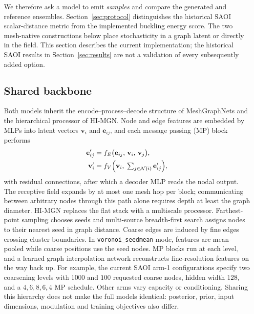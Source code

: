 We therefore ask a model to emit \emph{samples} and compare the generated and
reference ensembles. Section~\ref{sec:protocol} distinguishes the historical
SAOI scalar-distance metric from the implemented buckling energy score. The
two mesh-native constructions below place stochasticity in a graph latent or
directly in the field. This section describes the current implementation;
the historical SAOI results in Section~\ref{sec:results} are not a validation
of every subsequently added option.

\subsection{Shared backbone}
\label{sec:method:backbone}

Both models inherit the encode--process--decode structure of MeshGraphNets and
the hierarchical processor of HI-MGN. Node and edge features are embedded by
MLPs into latent vectors $\mathbf{v}_i$ and $\mathbf{e}_{ij}$, and each message
passing (MP) block performs
\begin{align}
  \mathbf{e}_{ij}' &= f_E\bigl(\mathbf{e}_{ij},\,\mathbf{v}_i,\,\mathbf{v}_j\bigr),
  \label{eq:mp-edge}\\
  \mathbf{v}_i'    &= f_V\Bigl(\mathbf{v}_i,\;
                        \textstyle\sum_{j\in\mathcal{N}(i)}\mathbf{e}_{ij}'\Bigr),
  \label{eq:mp-node}
\end{align}
with residual connections, after which a decoder MLP reads the nodal output.
The receptive field expands by at most one mesh hop per block; communicating
between arbitrary nodes through this path alone requires depth at least the
graph diameter. HI-MGN replaces the flat stack with a multiscale processor.
Farthest-point sampling chooses seeds and multi-source breadth-first search
assigns nodes to their nearest seed in graph distance. Coarse edges are
induced by fine edges crossing cluster boundaries. In
\texttt{voronoi\_seedmean} mode, features are mean-pooled while coarse
positions use the seed nodes. MP blocks run at each level, and a learned
graph interpolation network reconstructs fine-resolution features on the way
back up. For example, the current SAOI arm-1 configurations specify two
coarsening levels with $1000$ and $100$ requested coarse nodes, hidden width
$128$, and a $4,6,8,6,4$ MP schedule. Other arms vary capacity or conditioning.
Sharing this hierarchy does not make the full models identical: posterior,
prior, input dimensions, modulation and training objectives also differ.

